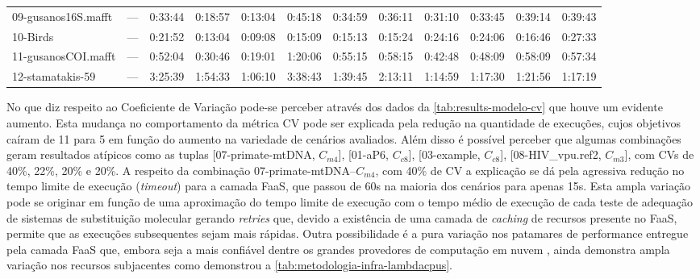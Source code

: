 \documentclass[english,brazilian]{UNISINOSmonografia} %
\begin{document}
{\begin{landscape}
\begin{table}
\begin{minipage}{1.1\linewidth}
\begin{tabularx}{\textwidth}{@{\extracolsep{\fill}}lWWWWWWWWWWW@{}}
					09-gusanos16S.mafft & --- & 0:33:44 & 0:18:57 & 0:13:04 & 0:45:18 & 0:34:59 & 0:36:11 & 0:31:10 & 0:33:45 & 0:39:14 & 0:39:43 \\
					10-Birds & --- & 0:21:52 & 0:13:04 & 0:09:08 & 0:15:09 & 0:15:13 & 0:15:24 & 0:24:16 & 0:24:06 & 0:16:46 & 0:27:33 \\
					11-gusanosCOI.mafft & --- & 0:52:04 & 0:30:46 & 0:19:01 & 1:20:06 & 0:55:15 & 0:58:15 & 0:42:48 & 0:48:09 & 0:58:09 & 0:57:34 \\
					12-stamatakis-59 & --- & 3:25:39 & 1:54:33 & 1:06:10 & 3:38:43 & 1:39:45 & 2:13:11 & 1:14:59 & 1:17:30 & 1:21:56 & 1:17:19 \\ 
					\bottomrule
				\end{tabularx}
			\end{minipage}
		\end{table}
	\end{landscape}
}



No que diz respeito ao Coeficiente de Variação pode-se perceber através dos dados da \autoref{tab:results-modelo-cv} que houve um evidente aumento.
%
Esta mudança no comportamento da métrica CV pode ser explicada pela redução na quantidade de execuções, cujos objetivos caíram de 11 para 5 em função do aumento na variedade de cenários avaliados.
%
Além disso é possível perceber que algumas combinações geram resultados atípicos como as tuplas [07-primate-mtDNA, $C_{m4}$], [01-aP6, $C_{c8}$], [03-example, $C_{c8}$], [08-HIV\_vpu.ref2, $C_{m3}$], com CVs de 40\%, 22\%, 20\% e 20\%.
%
A respeito da combinação 07-primate-mtDNA--$C_{m4}$, com 40\% de CV a explicação se dá pela agressiva redução no tempo limite de execução (\textit{timeout}) para a camada FaaS, que passou de 60s na maioria dos cenários para apenas 15s.
%
Esta ampla variação pode se originar em função de uma aproximação do tempo limite de execução com o tempo médio de execução de cada teste de adequação de sistemas de substituição molecular gerando \textit{retries} que, devido a existência de uma camada de \textit{caching} de recursos presente no FaaS, permite que as execuções subsequentes sejam mais rápidas.
%
Outra possibilidade é a pura variação nos patamares de performance entregue pela camada FaaS que, embora seja a mais confiável dentre os grandes provedores de computação em nuvem \cite{Wang2018}, ainda demonstra ampla variação nos recursos subjacentes como demonstrou a \autoref{tab:metodologia-infra-lambdacpus}.
\end{document}

